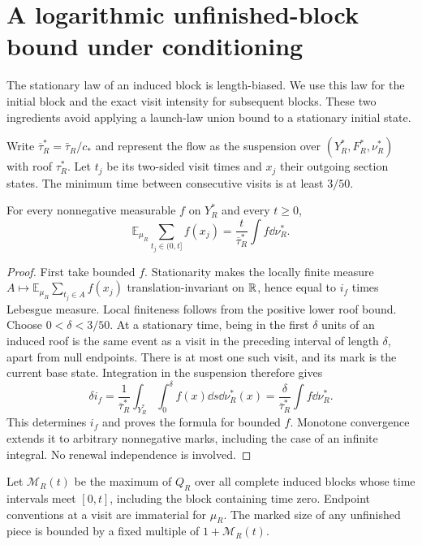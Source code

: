 \section{A logarithmic unfinished-block bound under conditioning}
\label{sec:conditioned-clock}
The stationary law of an induced block is length-biased. We use this law
for the initial block and the exact visit intensity for subsequent blocks.
These two ingredients avoid applying a launch-law union bound to a
stationary initial state.

Write $\overline\tau_R^*=\bar\tau_R/c_*$ and represent the flow as the
suspension over $(Y_R^*,F_R^*,\nu_R^*)$ with roof $\tau_R^*$. Let $t_j$
be its two-sided visit times and $x_j$ their outgoing section states.
The minimum time between consecutive visits is at least $3/50$.

\begin{lemma}
\label{lem:marked-visit-intensity}
For every nonnegative measurable $f$ on $Y_R^*$ and every $t\ge0$,
\begin{equation}\label{eq:marked-visit-intensity}
 \mathbb E_{\mu_R}\sum_{t_j\in(0,t]} f(x_j)
       =\frac{t}{\overline\tau_R^*}\int f\dd\nu_R^*.
\end{equation}
\end{lemma}
\begin{proof}
First take bounded $f$. Stationarity makes the locally finite measure
$A\mapsto\mathbb E_{\mu_R}\sum_{t_j\in A}f(x_j)$ translation-invariant
on $\mathbb R$, hence equal to $i_f$ times Lebesgue measure. Local finiteness
follows from the positive lower roof bound. Choose $0<\delta<3/50$.
At a stationary time, being in the first $\delta$ units of an induced
roof is the same event as a visit in the preceding interval of length
$\delta$, apart from null endpoints. There is at most one such visit,
and its mark is the current base state. Integration in the suspension
therefore gives
\[
 \delta i_f=\frac1{\overline\tau_R^*}
       \int_{Y_R^*}\int_0^\delta f(x)\dd s\dd\nu_R^*(x)
       =\frac{\delta}{\overline\tau_R^*}\int f\dd\nu_R^*.
\]
This determines $i_f$ and proves the formula for bounded $f$.
Monotone convergence extends it to arbitrary nonnegative marks, including
the case of an infinite integral. No renewal independence is involved.
\end{proof}

Let $\mathcal M_R(t)$ be the maximum of $Q_R$ over all complete induced
blocks whose time intervals meet $[0,t]$, including the block containing
time zero. Endpoint conventions at a visit are immaterial for $\mu_R$.
The marked size of any unfinished piece is bounded by a fixed multiple
of $1+\mathcal M_R(t)$.

